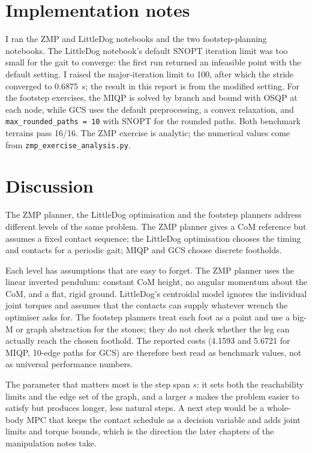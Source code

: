 \documentclass[11pt]{report}
\begin{document}
\section{Implementation notes}

I ran the ZMP and LittleDog notebooks and the two footstep-planning notebooks.
The LittleDog notebook's default SNOPT iteration limit was too small for the
gait to converge: the first run returned an infeasible point with the default
setting.  I raised the major-iteration limit to 100, after which the stride
converged to 0.6875~s; the result in this report is from the modified setting.
For the footstep exercises, the MIQP is solved by branch and bound with OSQP at
each node, while GCS uses the default preprocessing, a convex relaxation, and
\texttt{max\_rounded\_paths = 10} with SNOPT for the rounded paths.  Both
benchmark terrains pass 16/16.  The ZMP exercise is analytic; the numerical
values come from \texttt{zmp\_exercise\_analysis.py}.

\section{Discussion}

The ZMP planner, the LittleDog optimisation and the footstep planners address
different levels of the same problem.  The ZMP planner gives a CoM reference
but assumes a fixed contact sequence; the LittleDog optimisation chooses the
timing and contacts for a periodic gait; MIQP and GCS choose discrete
footholds.

Each level has assumptions that are easy to forget.  The ZMP planner uses the
linear inverted pendulum: constant CoM height, no angular momentum about the
CoM, and a flat, rigid ground.  LittleDog's centroidal model ignores the
individual joint torques and assumes that the contacts can supply whatever
wrench the optimiser asks for.  The footstep planners treat each foot as a
point and use a big-M or graph abstraction for the stones; they do not check
whether the leg can actually reach the chosen foothold.  The reported costs
(4.1593 and 5.6721 for MIQP, 10-edge paths for GCS) are therefore best read as
benchmark values, not as universal performance numbers.

The parameter that matters most is the step span $s$: it sets both the
reachability limits and the edge set of the graph, and a larger $s$ makes the
problem easier to satisfy but produces longer, less natural steps.  A next step
would be a whole-body MPC that keeps the contact schedule as a decision
variable and adds joint limits and torque bounds, which is the direction the
later chapters of the manipulation notes take.
\end{document}
